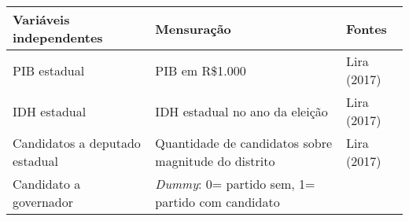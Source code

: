 \documentclass[]{article}
\begin{document}
\begin{longtable}[]{@{}lll@{}}
\toprule
\begin{minipage}[b]{0.37\columnwidth}\raggedright\strut
\textbf{Variáveis independentes}\strut
\end{minipage} & \begin{minipage}[b]{0.22\columnwidth}\raggedright\strut
\textbf{Mensuração}\strut
\end{minipage} & \begin{minipage}[b]{0.15\columnwidth}\raggedright\strut
\textbf{Fontes}\strut
\end{minipage}\tabularnewline
\midrule
\endhead
\begin{minipage}[t]{0.37\columnwidth}\raggedright\strut
PIB estadual\strut
\end{minipage} & \begin{minipage}[t]{0.22\columnwidth}\raggedright\strut
PIB em R\$1.000\strut
\end{minipage} & \begin{minipage}[t]{0.15\columnwidth}\raggedright\strut
Lira (2017)\strut
\end{minipage}\tabularnewline
\begin{minipage}[t]{0.37\columnwidth}\raggedright\strut
IDH estadual\strut
\end{minipage} & \begin{minipage}[t]{0.22\columnwidth}\raggedright\strut
IDH estadual no ano da eleição\strut
\end{minipage} & \begin{minipage}[t]{0.15\columnwidth}\raggedright\strut
Lira (2017)\strut
\end{minipage}\tabularnewline
\begin{minipage}[t]{0.37\columnwidth}\raggedright\strut
Candidatos a deputado estadual\strut
\end{minipage} & \begin{minipage}[t]{0.22\columnwidth}\raggedright\strut
Quantidade de candidatos sobre magnitude do distrito\strut
\end{minipage} & \begin{minipage}[t]{0.15\columnwidth}\raggedright\strut
Lira (2017)\strut
\end{minipage}\tabularnewline
\begin{minipage}[t]{0.37\columnwidth}\raggedright\strut
Candidato a governador\strut
\end{minipage} & \begin{minipage}[t]{0.22\columnwidth}\raggedright\strut
\emph{Dummy}: 0= partido sem, 1= partido com candidato\strut

\end{minipage}
\end{longtable}
\end{document}
